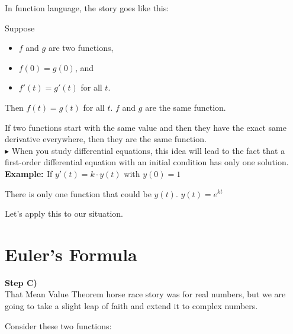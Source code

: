 \documentclass{ximera}
\begin{document}
In function language, the story goes like this:

Suppose 

\begin{itemize}
\item $f$ and $g$ are two functions,
\item $f(0) = g(0)$, and
\item $f'(t) = g'(t)$  for all $t$.
\end{itemize}

Then $f(t)=g(t)$ for all $t$.   $f$ and $g$ are the same function.



If two functions start with the same value and then they have the exact same derivative everywhere, then they are the same function. \\









$\blacktriangleright$  When you study differential equations, this idea will lead to the fact that a first-order differential equation with an initial condition has only one solution. \\

\textbf{\textcolor{blue!55!black}{Example: }} If $y'(t) = k \cdot y(t)$ with $y(0)=1$


There is only one function that could be $y(t)$.  $y(t) = e^{k t}$

Let's apply this to our situation. \\















\section{Euler's Formula}


\textbf{\textcolor{purple!85!blue}{Step C)}} \\


That Mean Value Theorem horse race story was for real numbers, but we are going to take a slight leap of faith and extend it to complex numbers.




Consider these two functions:
\end{document}

